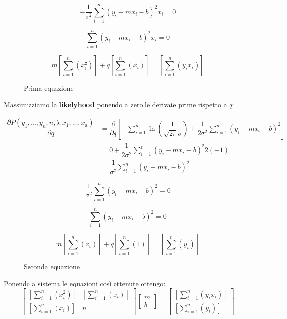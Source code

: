\documentclass[\main/main.tex]{subfiles}
\begin{document}
\[
	-\dfrac{1}{\sigma^2} \sum_{i=1}^n \left(y_i - mx_i - b \right)^2  x_i = 0
\]

\[
	\sum_{i=1}^n \left(y_i - mx_i - b \right)^2  x_i = 0
\]

\begin{figure}[H]
	\[
		m\left [ \sum_{i=1}^n \left(x_i^2 \right) \right ] + q \left [ \sum_{i=1}^n \left(x_i \right) \right ] = \left [ \sum_{i=1}^n \left(y_i x_i \right) \right ]
	\]
	\caption{Prima equazione}
\end{figure}

Massimizziamo la \textbf{likelyhood} ponendo a zero le derivate prime rispetto a $q$:

\begin{align}
	\dfrac{\partial P \left(y_1,...,y_n; n, b; x_1, ..., x_n \right)}{\partial q} & = \dfrac{\partial}{\partial q} \left [ - \sum_{i=1}^n \ln
		\left ( \dfrac{1}{\sqrt{2\pi}\sigma} \right )
		+ \dfrac{1}{2\sigma^2} \sum_{i=1}^n
		\left(y_i - mx_i - b \right)^2
		\right ]\\
	                                                                              & = 0 + \dfrac{1}{2\sigma^2} \sum_{i=1}^n \left(y_i - mx_i - b \right)^2 2 (-1) \\
	                                                                              & = \dfrac{1}{\sigma^2} \sum_{i=1}^n \left(y_i - mx_i - b \right)^2
\end{align}

\[
	\dfrac{1}{\sigma^2} \sum_{i=1}^n \left(y_i - mx_i - b \right)^2  = 0
\]

\[
	\sum_{i=1}^n \left(y_i - mx_i - b \right)^2 = 0
\]

\begin{figure}[H]
	\[
		m\left [ \sum_{i=1}^n \left(x_i \right) \right ] + q \left [ \sum_{i=1}^n \left(1 \right) \right ] = \left [ \sum_{i=1}^n \left(y_i \right) \right ]
	\]
	\caption{Seconda equazione}
\end{figure}

Ponendo a sistema le equazioni così ottenute ottengo:
\[
	\begin{bmatrix}
		\left [ \sum_{i=1}^n \left(x_i^2 \right) \right ] & \left [ \sum_{i=1}^n \left(x_i \right) \right ] \\
		\left [ \sum_{i=1}^n \left(x_i \right) \right ]   & n
	\end{bmatrix}
	\begin{bmatrix}
		m \\
		b
	\end{bmatrix}
	=
	\begin{bmatrix}
		\left [ \sum_{i=1}^n \left(y_i x_i \right) \right ] \\
		\left [ \sum_{i=1}^n \left(y_i \right) \right ]
	\end{bmatrix}
\]
\end{document}
